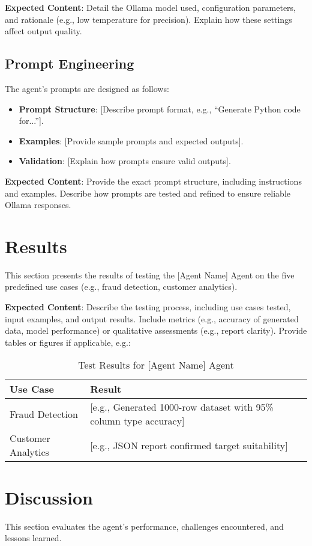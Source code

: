 \documentclass{article}
\begin{document}
\textbf{Expected Content}: Detail the Ollama model used, configuration parameters, and rationale (e.g., low temperature for precision). Explain how these settings affect output quality.

\subsection{Prompt Engineering}
The agent’s prompts are designed as follows:
\begin{itemize}[label=--]
    \item \textbf{Prompt Structure}: [Describe prompt format, e.g., “Generate Python code for...”].
    \item \textbf{Examples}: [Provide sample prompts and expected outputs].
    \item \textbf{Validation}: [Explain how prompts ensure valid outputs].
\end{itemize}

\textbf{Expected Content}: Provide the exact prompt structure, including instructions and examples. Describe how prompts are tested and refined to ensure reliable Ollama responses.

\section{Results}
This section presents the results of testing the [Agent Name] Agent on the five predefined use cases (e.g., fraud detection, customer analytics).

\textbf{Expected Content}: Describe the testing process, including use cases tested, input examples, and output results. Include metrics (e.g., accuracy of generated data, model performance) or qualitative assessments (e.g., report clarity). Provide tables or figures if applicable, e.g.:

\begin{table}[h]
\centering
\begin{tabular}{|l|l|}
\hline
\textbf{Use Case} & \textbf{Result} \\ \hline
Fraud Detection & [e.g., Generated 1000-row dataset with 95\% column type accuracy] \\ \hline
Customer Analytics & [e.g., JSON report confirmed target suitability] \\ \hline
\end{tabular}
\caption{Test Results for [Agent Name] Agent}
\end{table}

\section{Discussion}
This section evaluates the agent’s performance, challenges encountered, and lessons learned.
\end{document}
